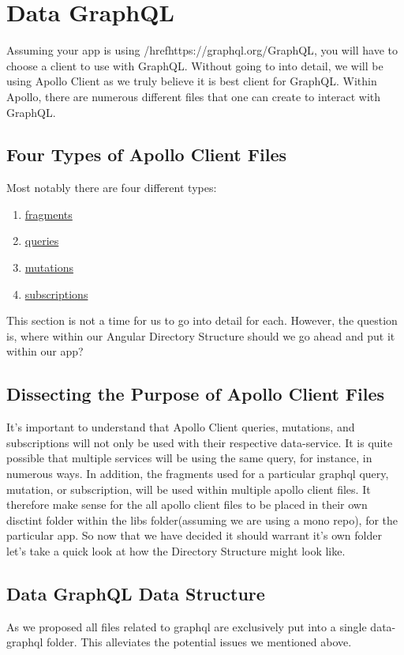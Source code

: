 \section{ Data GraphQL }
\maketitle{}

Assuming your app is using /href{https://graphql.org/}{GraphQL}, you will have
to choose a client to use with GraphQL. Without going to into detail, we will be
using Apollo Client as we truly believe it is best client for GraphQL. Within
Apollo, there are numerous different files that one can create to interact
with GraphQL.

\subsection{Four Types of Apollo Client Files}
Most notably there are four different types:
\begin{enumerate}
  \item \href{https://www.apollographql.com/docs/angular/features/fragments}{fragments}
  \item \href{https://www.apollographql.com/docs/angular/basics/queries/}{queries}
  \item \href{https://www.apollographql.com/docs/angular/basics/mutations}{mutations}
  \item \href{https://www.apollographql.com/docs/angular/features/subscriptions}{subscriptions}
\end{enumerate}

This section is not a time for us to go into detail for each. However, the
question is, where within our Angular Directory Structure should we go ahead and
put it within our app?

\subsection{Dissecting the Purpose of Apollo Client Files}
It's important to understand that Apollo Client queries, mutations, and
subscriptions will not only be used with their respective data-service. It is
quite possible that multiple services will be using the same query, for
instance, in numerous ways. In addition, the fragments used for a particular
graphql query, mutation, or subscription, will be used within multiple apollo
client files. It therefore make sense for the all apollo client files to be
placed in their own disctint folder within the libs folder(assuming we are using
a mono repo), for the particular app. So now that we have decided it should
warrant it's own folder let's take a quick look at how the Directory Structure
might look like.

\subsection{Data GraphQL Data Structure}


As we proposed all files related to graphql are exclusively put into a single
data-graphql folder. This alleviates the potential issues we mentioned above.
